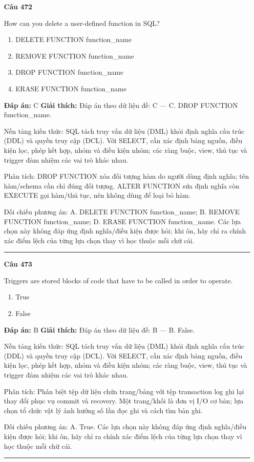 \documentclass[11pt,a4paper]{article}
\newenvironment{question}[1]{%
  \par\vspace{1em}\noindent\textbf{\large Câu #1}\par\vspace{0.4em}
}{%
  \par\vspace{1em}\hrule\vspace{0.6em}
}
\newenvironment{choices}{%
  \begin{enumerate}[label=\textbf{\Alph*.},leftmargin=2.2em,itemsep=2pt,topsep=3pt]
}{%
  \end{enumerate}
}
\newcommand{\choice}{\item}
\begin{document}
\begin{question}{472}
How can you delete a user-defined function in SQL?
\begin{choices}
\choice DELETE FUNCTION function_name
\choice REMOVE FUNCTION function_name
\choice DROP FUNCTION function_name
\choice ERASE FUNCTION function_name
\end{choices}
\textbf{Đáp án:} C
\textbf{Giải thích:} Đáp án theo dữ liệu đề: C — C. DROP FUNCTION function_name.

Nền tảng kiến thức: SQL tách truy vấn dữ liệu (DML) khỏi định nghĩa cấu trúc (DDL) và quyền truy cập (DCL). Với SELECT, cần xác định bảng nguồn, điều kiện lọc, phép kết hợp, nhóm và điều kiện nhóm; các ràng buộc, view, thủ tục và trigger đảm nhiệm các vai trò khác nhau.

Phân tích: DROP FUNCTION xóa đối tượng hàm do người dùng định nghĩa; tên hàm/schema cần chỉ đúng đối tượng. ALTER FUNCTION sửa định nghĩa còn EXECUTE gọi hàm/thủ tục, nên không dùng để loại bỏ hàm.

Đối chiếu phương án: A. DELETE FUNCTION function_name; B. REMOVE FUNCTION function_name; D. ERASE FUNCTION function_name. Các lựa chọn này không đáp ứng định nghĩa/điều kiện được hỏi; khi ôn, hãy chỉ ra chính xác điểm lệch của từng lựa chọn thay vì học thuộc mỗi chữ cái.
\end{question}

\begin{question}{473}
Triggers are stored blocks of code that have to be called in order to operate.
\begin{choices}
\choice True
\choice False
\end{choices}
\textbf{Đáp án:} B
\textbf{Giải thích:} Đáp án theo dữ liệu đề: B — B. False.

Nền tảng kiến thức: SQL tách truy vấn dữ liệu (DML) khỏi định nghĩa cấu trúc (DDL) và quyền truy cập (DCL). Với SELECT, cần xác định bảng nguồn, điều kiện lọc, phép kết hợp, nhóm và điều kiện nhóm; các ràng buộc, view, thủ tục và trigger đảm nhiệm các vai trò khác nhau.

Phân tích: Phân biệt tệp dữ liệu chứa trang/bảng với tệp transaction log ghi lại thay đổi phục vụ commit và recovery. Một trang/khối là đơn vị I/O cơ bản; lựa chọn tổ chức vật lý ảnh hưởng số lần đọc ghi và cách tìm bản ghi.

Đối chiếu phương án: A. True. Các lựa chọn này không đáp ứng định nghĩa/điều kiện được hỏi; khi ôn, hãy chỉ ra chính xác điểm lệch của từng lựa chọn thay vì học thuộc mỗi chữ cái.
\end{question}
\end{document}
